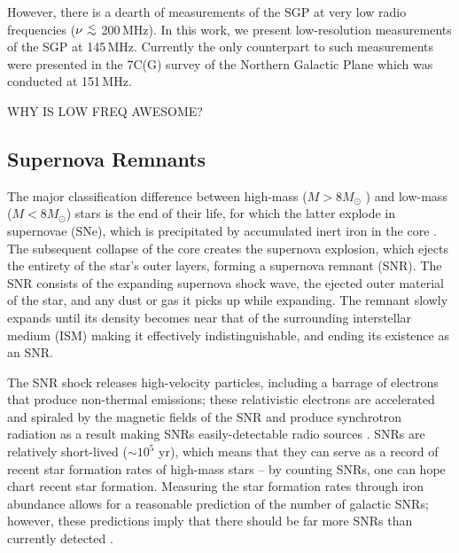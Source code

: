\documentclass[useAMS,usenatbib]{mn2e}
\newcommand {\aplt} {\ {\raise-.5ex\hbox{$\buildrel<\over\sim$}}\ }
\begin{document}
However, there is a dearth of measurements of the SGP at very low radio frequencies ($\nu\aplt$200\,MHz). In this work, we present {\color{red}low-resolution} measurements of the SGP at 145\,MHz.  Currently the only counterpart to such measurements were presented in the 7C(G) survey of the Northern Galactic Plane \citep{Vessey.98} which was conducted at 151\,MHz. 

{\color{red} WHY IS LOW FREQ AWESOME?}

\subsection{Supernova Remnants}
The major classification difference between high-mass ($M > 8M_{\odot}$ ) and low-mass ($M < 8 M_\odot$) stars is the end of their life, for which the latter explode in supernovae (SNe), which is precipitated by accumulated inert iron in the core \citep{Arnett.73}.  
The subsequent collapse of the core creates the supernova explosion, which ejects the entirety of the star’s outer layers, forming a supernova remnant (SNR).  The SNR consists of the expanding supernova shock wave, the ejected outer material of the star, and any dust or gas it picks up while expanding.  
The remnant slowly expands until its density becomes near that of the surrounding interstellar medium (ISM) making it effectively indistinguishable, and ending its existence as an SNR.  


The SNR shock releases high-velocity particles, including a barrage of electrons that produce non-thermal emissions; these relativistic electrons are accelerated and spiraled by the magnetic fields of the SNR and produce synchrotron radiation as a result making SNRs easily-detectable radio sources \citep[e.g.][]{Burbidge.56,Stupar_cat.11}. 
SNRs are relatively short-lived ($\sim10^5$ yr), which means that they can serve as a record of recent star formation rates of high-mass stars -- by counting SNRs, one can hope chart recent star formation.
Measuring the star formation rates through iron abundance allows for a reasonable prediction of the number of galactic SNRs; however, these predictions imply that there should be far more SNRs than currently detected \citep[e.g.][]{Brogan.06}.  
\end{document}
